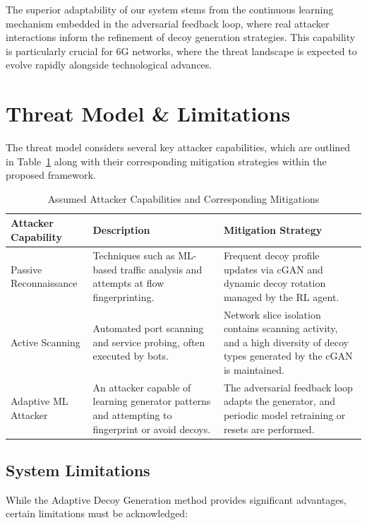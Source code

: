 \documentclass{article}
\begin{document}
The superior adaptability of our system stems from the continuous learning mechanism embedded in the adversarial feedback loop, where real attacker interactions inform the refinement of decoy generation strategies. This capability is particularly crucial for 6G networks, where the threat landscape is expected to evolve rapidly alongside technological advances.

\section{Threat Model \& Limitations}

\nopagebreak
The threat model considers several key attacker capabilities, which are outlined in Table~\ref{tab:threat_model} along with their corresponding mitigation strategies within the proposed framework.

\nopagebreak[4]
\begin{table}[htbp!]
\centering
\caption{Assumed Attacker Capabilities and Corresponding Mitigations}
\label{tab:threat_model}
\begin{tabularx}{\textwidth}{|l|X|X|}
\toprule
\textbf{Attacker Capability} & \textbf{Description} & \textbf{Mitigation Strategy} \\
\midrule     
Passive Reconnaissance & Techniques such as ML-based traffic analysis and attempts at flow fingerprinting. & Frequent decoy profile updates via cGAN and dynamic decoy rotation managed by the RL agent. \\
\addlinespace
Active Scanning & Automated port scanning and service probing, often executed by bots. & Network slice isolation contains scanning activity, and a high diversity of decoy types generated by the cGAN is maintained. \\
\addlinespace
Adaptive ML Attacker & An attacker capable of learning generator patterns and attempting to fingerprint or avoid decoys. & The adversarial feedback loop adapts the generator, and periodic model retraining or resets are performed. \\
\bottomrule
\end{tabularx}
\end{table}

\subsection{System Limitations}

While the Adaptive Decoy Generation method provides significant advantages, certain limitations must be acknowledged:
\end{document}
